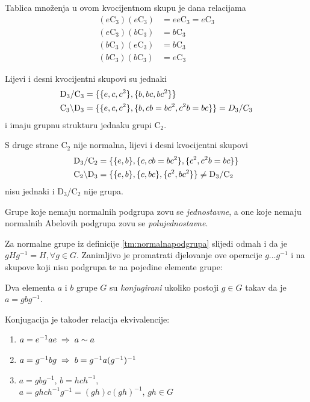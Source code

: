 \begin{primjer}
Tablica množenja u ovom kvocijentnom skupu je dana relacijama
\begin{align}
    (e\mathrm{C}_3)(e\mathrm{C}_3) &= ee \mathrm{C}_3 = e\mathrm{C}_3\\
    (e\mathrm{C}_3)(b\mathrm{C}_3) &= b\mathrm{C}_3  \\
    (b\mathrm{C}_3)(e\mathrm{C}_3) &= b\mathrm{C}_3  \\
    (b\mathrm{C}_3)(b\mathrm{C}_3) &= e\mathrm{C}_3 
\end{align}

Lijevi i desni kvocijentni skupovi su jednaki
\begin{align*}
{\rm D}_{3}/{\rm C}_3 &= \{\{e,c,c^2\}, \{b, bc, bc^2\}\} \\
{\rm C}_3\backslash{\rm D}_{3} &= \{\{e,c,c^2\}, \{b, cb=bc^2, c^2b=bc\}\}
    = D_{3}/C_3
\end{align*}
i imaju grupnu strukturu jednaku grupi $\mathrm{C}_2$.
\label{pr:D3oC3}
\end{primjer}

S druge strane $\mathrm{C}_2$ nije normalna, lijevi i desni kvocijentni
skupovi
\begin{align*}
{\rm D}_{3}/{\rm C}_2 &= \{\{e,b\}, \{c, cb=bc^2\}, \{c^2, c^2b=bc\}\} \\
{\rm C}_2\backslash{\rm D}_{3} &= \{\{e,b\}, \{c, bc\}, \{c^2, bc^2\}\}
    \neq {\rm D}_{3}/{\rm C}_2
\end{align*}
nisu jednaki i $\mathrm{D}_{3}$/$\mathrm{C}_2$ nije grupa.

Grupe koje nemaju normalnih podgrupa zovu se \emph{jednostavne},
a one koje nemaju normalnih Abelovih podgrupa zovu se \emph{polujednostavne}.

Za normalne grupe iz definicije \ref{tm:normalnapodgrupa} slijedi odmah i
da je $g H g^{-1} = H, \forall g\in G$. Zanimljivo je promatrati djelovanje
ove operacije $g \ldots g^{-1}$ i na skupove koji nisu podgrupa te
na pojedine elemente grupe:

\begin{definicija}
Dva elementa $a$ i $b$ grupe $G$ su \emph{konjugirani} ukoliko
postoji $g\in G$ takav da je $a=gbg^{-1}$.
\label{tm:konjugacija}
\end{definicija}

Konjugacija je također relacija ekvivalencije:
\begin{enumerate}
\item $a=e^{-1} a e  \;\Rightarrow\; a\sim a$
\item $a=g^{-1} b g  \;\Rightarrow\;  b= g^{-1} a (g^{-1})^{-1}$
\item $a=g b g^{-1}$, $b=hch^{-1}$, \\
         $a=ghch^{-1}g^{-1}=(gh)c(gh)^{-1}$, $gh\in G$
  
\end{enumerate}


